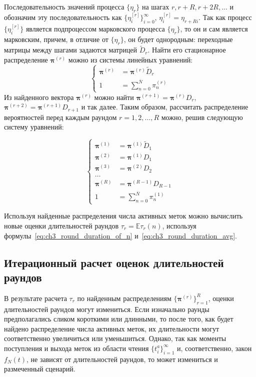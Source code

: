 Последовательность значений процесса $\{ \eta_r \}$ на шагах $r, r+R, r+2R, \dots$ и обозначим эту последовательность как $\{ \eta_i^{[r]} \}_{i=0}^\infty$, $\eta_i^{[r]} = \eta_{r+Ri}$. Так как процесс $\{ \eta_{i}^{[r]} \}$ является подпроцессом марковского процесса $\{ \eta_r \}$, то он и сам является марковским, причем, в отличие от $\{ \eta_r \}$, он будет однородным: переходные матрицы между шагами задаются матрицей $\widetilde{D}_r$. Найти его стационарное распределение $\bm{\pi}^{(r)}$ можно из системы линейных уравнений:
$$
	\begin{cases}
		\bm{\pi}^{(r)} &= \bm{\pi}^{(r)} \widetilde{D}_r\\
		1 &= \sum\limits_{n=0}^{\overline{N}} \pi^{(r)}_n
	\end{cases}
$$
Из найденного вектора $\bm{\pi}^{(r)}$ можно найти $\bm{\pi}^{(r+1)} = \bm{\pi}^{(r)} D_r$, $\bm{\pi}^{(r+2)} = \bm{\pi}^{(r+1)} D_{r+1}$ и так далее. Таким образом, рассчитать распределение вероятностей перед каждым раундом $r = 1, 2, \dots, R$ можно, решив следующую систему уравнений:

\begin{equation}\label{eq:ch3_bg_pmf_system}
	\begin{cases}
		\bm{\pi}^{(1)} &= \bm{\pi}^{(1)} \widetilde{D}_1\\
		\bm{\pi}^{(2)} &= \bm{\pi}^{(1)} D_1\\
		\bm{\pi}^{(3)} &= \bm{\pi}^{(2)} D_2\\
		\dots&\\
		\bm{\pi}^{(R)} &= \bm{\pi}^{(R-1)} D_{R-1}\\
		1              &= \sum\limits_{n=0}^{\overline{N}} \pi^{(1)}_n
	\end{cases}
\end{equation}

Используя найденные распределения числа активных меток можно вычислить новые оценки длительностей раундов $\tau_r = \mathbb{E} \tau_r(n)$, используя формулы~\eqref{eq:ch3_round_duration_of_n} и~\eqref{eq:ch3_round_duration_avg}.



\subsection{Итерационный расчет оценок длительностей раундов}\label{subsec:ch3_iterative_algorithm}
В результате расчета $\tau_r$ по найденным распределениям $\{ \bm{\pi}^{(r)} \}_{r=1}^R$, оценки длительностей раундов могут измениться. Если изначально раунды предполагались сликом короткими или длинными, то после того, как будет найдено распределение числа активных меток, их длительности могут соответственно увеличиться или уменьшиться. Однако, так как моменты поступления и выхода меток из области чтения $\{ t_i^{a} \}_{i=1}^\infty$ и, соответственно, закон $f_N(t)$, не зависят от длительностей раундов, то может измениться и размеченный сценарий.

